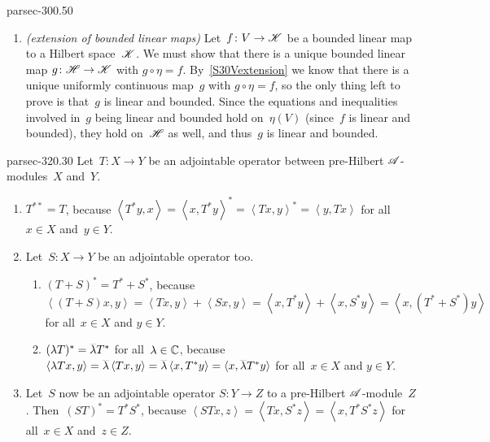 \documentclass[b5page]{book}
\begin{document}
\begin{solution}{parsec-300.50}
\begin{enumerate}
Any equation  $s(x_1,\dotsc,x_n)=t(x_1,\dotsc,x_n)$
involving these (and other continuous) operations
that holds for all $x_1,\dotsc,x_n\in V$
will hold for all $x_1,\dotsc,x_n\in \scrH$
as well,
since the continuous functions $s$ and~$t$
defined on $\scrH\times\dotsb \times\scrH$
are equal when equal
on the dense subset $V\times\dotsb\times V$.
Whence~$\scrH$ is a vector space.
Similarly,
any $\leq$-inequality between continuous operations
on~$V$ holds for~$\scrH$ as well,
which implies that~$\left<\,\cdot\,,\,\cdot\,\right>$
gives an inner product on~$\scrH$.
Since the equation $\left<x-y,x-y\right>=d(x,y)^2$
which holds on~$V$ holds on~$\scrH$,
we see that the metric induced by the inner product on~$\scrH$
coincides with the metric defined on~$\scrH$ in point~\ref{S40Vmetric}.
As a result, the inner product on~$\scrH$
is definite and complete,
and so~$\scrH$ is a Hilbert space.
\item
\emph{(extension of bounded linear maps)}
Let~$f\colon V\to\mathscr{K}$ be a bounded linear map
to a Hilbert space~$\mathscr{K}$.
We must show that there is a unique bounded linear map
$g\colon \mathscr{H}\to \mathscr{K}$ with $g\circ \eta = f$.
By~\ref{S30Vextension}
we know that there is a unique uniformly continuous map~$g$
with $g\circ \eta=f$,
so the only thing left to prove is that~$g$
is linear and bounded.
Since the equations and inequalities involved in~$g$ being linear
and bounded hold on~$\eta(V)$
(since~$f$ is linear and bounded),
they hold on~$\scrH$ as well,
and thus~$g$ is linear and bounded.
\end{enumerate}
\end{solution}
\begin{solution}{parsec-320.30}%
Let~$T\colon X\to Y$ be an adjointable operator
between pre-Hilbert $\mathscr{A}$-modules~$X$ and~$Y$.
\begin{enumerate}
\item
$T^{**}=T$,
because 
$\left<T^*y,x\right>
= \left<x,T^*y\right>^* 
= \left<Tx,y\right>^*
= \left<y,Tx\right>$
for all~$x\in X$ and~$y\in Y$.
\item
Let~$S\colon X\to Y$ be an adjointable operator too.
\begin{enumerate}
\item
$(T+S)^*=T^*+S^*$,
because $\left<(T+S)x,y\right>
= \left<Tx,y\right>+\left<Sx,y\right>
= \left<x,T^*y\right>+\left<x,S^*y\right>
= \left<x,(T^*+S^*)y\right>$
for all~$x\in X$ and $y\in Y$.
\item
$(\lambda T)^* = \smash{\overline{\lambda}}T^*$
for all~$\lambda\in \mathbb{C}$,
because $\left<\lambda Tx,y\right>
= \smash{\overline{\lambda}}\left<Tx,y\right>
= \smash{\overline{\lambda}}\left<x,T^*y\right>
= \left<x,\smash{\overline{\lambda}}T^*y\right>$
for all~$x\in X$ and $y\in Y$.
\end{enumerate}

\item
Let~$S$ now be an adjointable operator
$S\colon Y\to Z$
to a pre-Hilbert $\mathscr{A}$-module~$Z$.
Then~$(ST)^*=T^*S^*$,
because
$\left<STx,z\right>
= \left<Tx,S^*z\right>
= \left<x,T^*S^*z\right>$
for all~$x\in X$ and~$z\in Z$.
\end{enumerate}
\end{solution}
\end{document}
